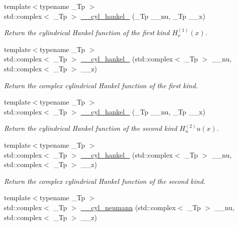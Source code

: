\begin{DoxyCompactItemize}
{\footnotesize template$<$typename \+\_\+\+Tp $>$ }\\std\+::complex$<$ \+\_\+\+Tp $>$ \hyperlink{namespacestd_1_1____detail_aac3fc60c1210e8f2ae3cf05cdc7bad84}{\+\_\+\+\_\+cyl\+\_\+hankel\+\_} (\+\_\+\+Tp \+\_\+\+\_\+nu, \+\_\+\+Tp \+\_\+\+\_\+x)
\begin{DoxyCompactList}\small\item\em Return the cylindrical Hankel function of the first kind $ H^{(1)}_\nu(x) $. \end{DoxyCompactList}\item 
{\footnotesize template$<$typename \+\_\+\+Tp $>$ }\\std\+::complex$<$ \+\_\+\+Tp $>$ \hyperlink{namespacestd_1_1____detail_a9904b6007ef78ef777ac8345f6e47960}{\+\_\+\+\_\+cyl\+\_\+hankel\+\_} (std\+::complex$<$ \+\_\+\+Tp $>$ \+\_\+\+\_\+nu, std\+::complex$<$ \+\_\+\+Tp $>$ \+\_\+\+\_\+z)
\begin{DoxyCompactList}\small\item\em Return the complex cylindrical Hankel function of the first kind. \end{DoxyCompactList}\item 
{\footnotesize template$<$typename \+\_\+\+Tp $>$ }\\std\+::complex$<$ \+\_\+\+Tp $>$ \hyperlink{namespacestd_1_1____detail_a98615677d4042ef02fe2faf326f1a614}{\+\_\+\+\_\+cyl\+\_\+hankel\+\_} (\+\_\+\+Tp \+\_\+\+\_\+nu, \+\_\+\+Tp \+\_\+\+\_\+x)
\begin{DoxyCompactList}\small\item\em Return the cylindrical Hankel function of the second kind $ H^{(2)}_nu(x) $. \end{DoxyCompactList}\item 
{\footnotesize template$<$typename \+\_\+\+Tp $>$ }\\std\+::complex$<$ \+\_\+\+Tp $>$ \hyperlink{namespacestd_1_1____detail_a3a8bdfd85729c705dec2586dfa5b275b}{\+\_\+\+\_\+cyl\+\_\+hankel\+\_} (std\+::complex$<$ \+\_\+\+Tp $>$ \+\_\+\+\_\+nu, std\+::complex$<$ \+\_\+\+Tp $>$ \+\_\+\+\_\+z)
\begin{DoxyCompactList}\small\item\em Return the complex cylindrical Hankel function of the second kind. \end{DoxyCompactList}\item 
{\footnotesize template$<$typename \+\_\+\+Tp $>$ }\\std\+::complex$<$ \+\_\+\+Tp $>$ \hyperlink{namespacestd_1_1____detail_ac73a4e3b8ac311760c998277aadb0fcb}{\+\_\+\+\_\+cyl\+\_\+neumann} (std\+::complex$<$ \+\_\+\+Tp $>$ \+\_\+\+\_\+nu, std\+::complex$<$ \+\_\+\+Tp $>$ \+\_\+\+\_\+z)

\end{DoxyCompactItemize}
